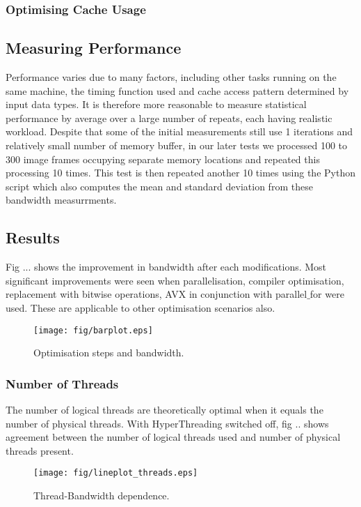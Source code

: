 \documentclass[journal]{IEEEtran}
\begin{document}
\subsubsection{Optimising Cache Usage}


\subsection{Measuring Performance}
Performance varies due to many factors, including other tasks running on the same machine, the timing function used and cache access pattern determined by input data types. It is therefore more reasonable to measure statistical performance by average over a large number of repeats, each having realistic workload. Despite that some of the initial measurements still use 1 iterations and relatively small number of memory buffer, in our later tests we processed 100 to 300 image frames occupying separate memory locations and repeated this processing 10 times. This test is then repeated another 10 times using the Python script which also computes the mean and standard deviation from these bandwidth measurrments.

\subsection{Results}

Fig ... shows the improvement in bandwidth after each modifications. Most significant improvements were seen when parallelisation, compiler optimisation, replacement with bitwise operations, AVX in conjunction with parallel$\_$for were used. These are applicable to other optimisation scenarios also. 

\begin{figure}[h]
\centering
\texttt{[image: fig/barplot.eps]}
\caption{Optimisation steps and bandwidth. }
\label{opt_step}
\end{figure}

\subsubsection{Number of Threads}
The number of logical threads are theoretically optimal when it equals the number of physical threads. With HyperThreading switched off, fig .. shows agreement between the number of logical threads used and number of physical threads present. 

\begin{figure}[h]
\centering
\texttt{[image: fig/lineplot\_threads.eps]}
\caption{Thread-Bandwidth dependence. }
\label{thread}
\end{figure}
\end{document}

